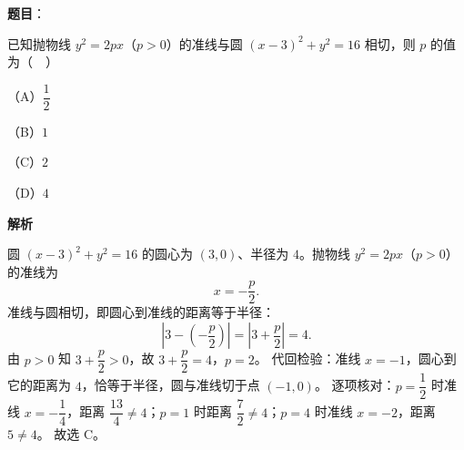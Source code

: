 \begin{answer}

\textbf{题目}：

已知抛物线 $y^2=2px$（$p>0$）的准线与圆 $(x-3)^2+y^2=16$ 相切，则 $p$ 的值为（　）

（A）$\dfrac12$

（B）$1$

（C）$2$

（D）$4$

\textbf{解析}

圆 $(x-3)^2+y^2=16$ 的圆心为 $(3,0)$、半径为 $4$。抛物线 $y^2=2px$（$p>0$）的准线为
\nopagebreak[4]
\[x=-\frac p2.\]
准线与圆相切，即圆心到准线的距离等于半径：
\nopagebreak[4]
\[\left|3-\left(-\frac p2\right)\right|=\left|3+\frac p2\right|=4.\]
由 $p>0$ 知 $3+\dfrac p2>0$，故 $3+\dfrac p2=4$，$p=2$。
代回检验：准线 $x=-1$，圆心到它的距离为 $4$，恰等于半径，圆与准线切于点 $(-1,0)$。
逐项核对：$p=\dfrac12$ 时准线 $x=-\dfrac14$，距离 $\dfrac{13}{4}\neq 4$；$p=1$ 时距离 $\dfrac72\neq4$；$p=4$ 时准线 $x=-2$，距离 $5\neq4$。
故选 C。


\end{answer}
